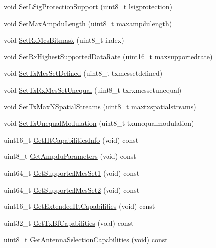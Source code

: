 \begin{DoxyCompactItemize}
\item 
void \hyperlink{classns3_1_1HtCapabilities_ab4460b4436d5081434fccdaecddc0040}{Set\+L\+Sig\+Protection\+Support} (uint8\+\_\+t lsigprotection)
\item 
void \hyperlink{classns3_1_1HtCapabilities_a82fcb22af30c65867ebe133b84a2d8f0}{Set\+Max\+Ampdu\+Length} (uint8\+\_\+t maxampdulength)
\item 
void \hyperlink{classns3_1_1HtCapabilities_aa6eca50b3ba924a5eeacd735d588193b}{Set\+Rx\+Mcs\+Bitmask} (uint8\+\_\+t index)
\item 
void \hyperlink{classns3_1_1HtCapabilities_a389e977f66c2ae7cf25885b2eaf58187}{Set\+Rx\+Highest\+Supported\+Data\+Rate} (uint16\+\_\+t maxsupportedrate)
\item 
void \hyperlink{classns3_1_1HtCapabilities_a2da0c1e107ed24b1a429979932ad4a9f}{Set\+Tx\+Mcs\+Set\+Defined} (uint8\+\_\+t txmcssetdefined)
\item 
void \hyperlink{classns3_1_1HtCapabilities_a5e34791436698479c1db0c5664e473bc}{Set\+Tx\+Rx\+Mcs\+Set\+Unequal} (uint8\+\_\+t txrxmcssetunequal)
\item 
void \hyperlink{classns3_1_1HtCapabilities_ae60bef548af90911737267ca1f029da8}{Set\+Tx\+Max\+N\+Spatial\+Streams} (uint8\+\_\+t maxtxspatialstreams)
\item 
void \hyperlink{classns3_1_1HtCapabilities_aae465cd343d60a2a91ff86476280e660}{Set\+Tx\+Unequal\+Modulation} (uint8\+\_\+t txunequalmodulation)
\item 
uint16\+\_\+t \hyperlink{classns3_1_1HtCapabilities_a06cb3447ea7e89dcebb6b1d4a03f328b}{Get\+Ht\+Capabilities\+Info} (void) const 
\item 
uint8\+\_\+t \hyperlink{classns3_1_1HtCapabilities_a37666fee9b537b52dc7c1f8cbc53e901}{Get\+Ampdu\+Parameters} (void) const 
\item 
uint64\+\_\+t \hyperlink{classns3_1_1HtCapabilities_ae0d06c6099577733b18e11e1e81ae85f}{Get\+Supported\+Mcs\+Set1} (void) const 
\item 
uint64\+\_\+t \hyperlink{classns3_1_1HtCapabilities_acea61a394e15d2c3ae73361083e83a56}{Get\+Supported\+Mcs\+Set2} (void) const 
\item 
uint16\+\_\+t \hyperlink{classns3_1_1HtCapabilities_aa08cfbdab6feef1a61f205204622afab}{Get\+Extended\+Ht\+Capabilities} (void) const 
\item 
uint32\+\_\+t \hyperlink{classns3_1_1HtCapabilities_a26a22b8cd1bb654f500d1fe589dcfa97}{Get\+Tx\+Bf\+Capabilities} (void) const 
\item 
uint8\+\_\+t \hyperlink{classns3_1_1HtCapabilities_a903f35a07a34c42426fe12952b9b8659}{Get\+Antenna\+Selection\+Capabilities} (void) const 

\end{DoxyCompactItemize}
